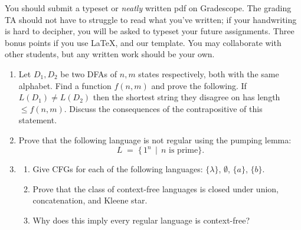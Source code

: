 \documentclass[11pt]{article}
\begin{document}

You should submit a typeset or \emph{neatly} written pdf on Gradescope.  The grading TA should not have to struggle to read what you've written; if your handwriting is hard to decipher, you will be asked to typeset your future assignments. Three bonus points if you use \LaTeX, and our template. You may collaborate with other students, but any written work should be your own. 
\begin{enumerate}
    \item Let $D_1, D_2$ be two DFAs of $n,m$ states respectively, both with the same alphabet. Find a function $f(n,m)$ and prove the following. If $L(D_1) \neq L(D_2)$ then the shortest string they disagree on has length $\leq f(n,m)$. Discuss the consequences of the contrapositive of this statement.

    \begin{answer}
    \end{answer}

    \item Prove that the following language is not regular using the pumping lemma:
    \[
    L \;=\; \{\, 1^n \,\mid\, n \text{ is prime}\}.
    \]

    \begin{answer}
    \end{answer}

\vspace{1em}  
    \item 
    \begin{enumerate}
        \item Give CFGs for each of the following languages: $\{\lambda\}$, $\emptyset$, $\{a\}$, $\{b\}$.    
    
    \begin{answer}
    \end{answer}
        \item Prove that the class of context-free languages is closed under union, concatenation, and Kleene star.
    
    \begin{answer}
    \end{answer}
        \item Why does this imply every regular language is context-free?
    
    \begin{answer}
    \end{answer}
    \end{enumerate}    


\end{enumerate}
\end{document}
